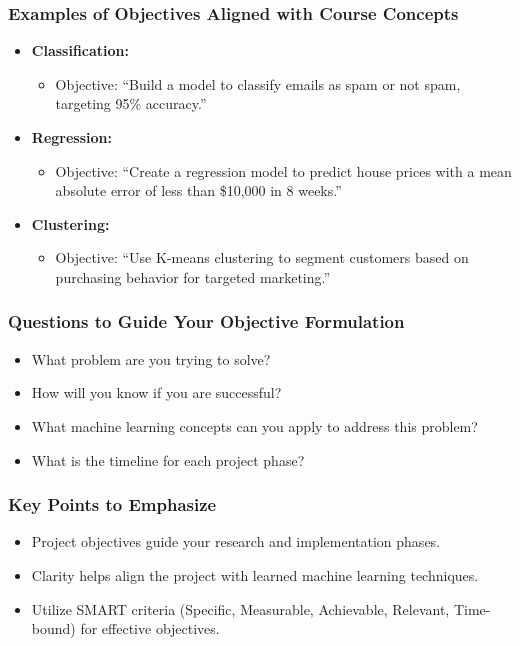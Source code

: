 \documentclass[aspectratio=169]{beamer}
\begin{document}
\begin{frame}[fragile]
    \frametitle{Examples of Objectives Aligned with Course Concepts}
    \begin{itemize}
        \item \textbf{Classification:} 
            \begin{itemize}
                \item Objective: “Build a model to classify emails as spam or not spam, targeting 95\% accuracy.”
            \end{itemize}
        
        \item \textbf{Regression:}
            \begin{itemize}
                \item Objective: “Create a regression model to predict house prices with a mean absolute error of less than \$10,000 in 8 weeks.”
            \end{itemize}
        
        \item \textbf{Clustering:}
            \begin{itemize}
                \item Objective: “Use K-means clustering to segment customers based on purchasing behavior for targeted marketing.”
            \end{itemize}
    \end{itemize}
\end{frame}

\begin{frame}[fragile]
    \frametitle{Questions to Guide Your Objective Formulation}
    \begin{itemize}
        \item What problem are you trying to solve?
        \item How will you know if you are successful?
        \item What machine learning concepts can you apply to address this problem?
        \item What is the timeline for each project phase?
    \end{itemize}
\end{frame}

\begin{frame}[fragile]
    \frametitle{Key Points to Emphasize}
    \begin{itemize}
        \item Project objectives guide your research and implementation phases.
        \item Clarity helps align the project with learned machine learning techniques.
        \item Utilize SMART criteria (Specific, Measurable, Achievable, Relevant, Time-bound) for effective objectives.
    \end{itemize}
\end{frame}
\end{document}
